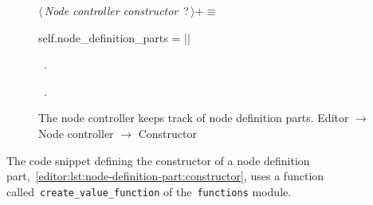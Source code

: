\documentclass[%
    a4paper,    %
    justified,  %
    nobib,      %
    openany     %
]{tufte-book}
\makeatletter
\renewcommand{\label}[1]{\@tufte@label{##1}}%
\makeatother
\begin{document}
\begin{figure}
\begin{flushleft} \small
\begin{minipage}{\linewidth}\label{scrap111}\raggedright\small
{} $\langle\,${\itshape Node controller constructor}\nobreak\ {\footnotesize {?}}$\,\rangle+\equiv$
\vspace{-1ex}
\begin{pythoncode}
    self.node_definition_parts = {}
|\NWsep|
\end{pythoncode}
\vspace{1.5ex}
\footnotesize
\begin{list}{}{\setlength{\itemsep}{-\parsep}\setlength{\itemindent}{-\leftmargin}}
\item \NWtxtMacroDefBy\ .
\item \NWtxtMacroRefIn\ .

\item{}
\end{list}
\end{minipage}\vspace{4ex}
\end{flushleft}
\caption{The node controller keeps track of node definition parts.
  \newline{}\newline{}Editor $\rightarrow$ Node controller $\rightarrow$
  Constructor}
\label{editor:lst:node-controller:constructor:node-definition-parts}
\end{figure}

The code snippet defining the constructor of a node definition
part,~\autoref{editor:lst:node-definition-part:constructor}, uses a function
called~\verb=create_value_function= of the~\verb=functions= module.
\end{document}
